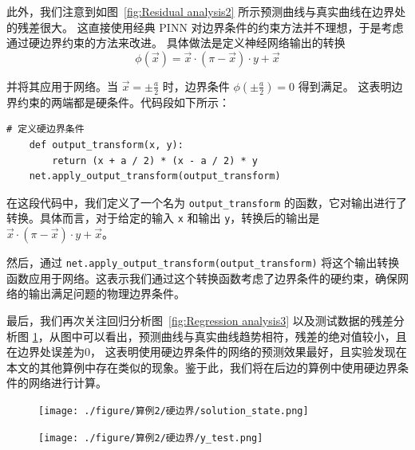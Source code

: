 \documentclass{Sichuan Normal University}
\begin{document}
此外，我们注意到如图~\ref{fig:Residual analysis2} 所示预测曲线与真实曲线在边界处的残差很大。
这直接使用经典 PINN 对边界条件的约束方法并不理想，于是考虑通过硬边界约束的方法来改进。
具体做法是定义神经网络输出的转换
\begin{equation}
    \phi(\vec{x})=\vec{x} \cdot(\pi-\vec{x}) \cdot y+\vec{x}
\end{equation}

并将其应用于网络。当 $\vec{x}=\pm \frac{a}{2}$ 时，边界条件 $\phi(\pm \frac{a}{2})=0$ 得到满足。
这表明边界约束的两端都是硬条件。代码段如下所示：
\begin{lstlisting}[style=python,basicstyle=\footnotesize\fontspec{Courier New},]  
    # 定义硬边界条件
    def output_transform(x, y):
        return (x + a / 2) * (x - a / 2) * y
    net.apply_output_transform(output_transform)
\end{lstlisting}

在这段代码中，我们定义了一个名为 \texttt{output\_transform} 的函数，它对输出进行了转换。具体而言，对于给定的输入 \texttt{x} 和输出 \texttt{y}，转换后的输出是 $\vec{x} \cdot(\pi-\vec{x}) \cdot y+\vec{x}$。

然后，通过 \texttt{net.apply\_output\_transform(output\_transform)} 将这个输出转换函数应用于网络。这表示我们通过这个转换函数考虑了边界条件的硬约束，确保网络的输出满足问题的物理边界条件。

最后，我们再次关注回归分析图~\ref{fig:Regression analysis3} 以及测试数据的残差分析图 \ref{fig:Residual analysis3}，从图中可以看出，预测曲线与真实曲线趋势相符，残差的绝对值较小，且在边界处误差为$0$，
这表明使用硬边界条件的网络的预测效果最好，且实验发现在本文的其他算例中存在类似的现象。鉴于此，我们将在后边的算例中使用硬边界条件的网络进行计算。

\begin{figure}[H]
    \centering
    \begin{minipage}[c]{0.48\textwidth}
    \centering
    \texttt{[image: ./figure/算例2/硬边界/solution\_state.png]}
    \end{minipage}
    \hspace{0.02\textwidth}
    \begin{minipage}[c]{0.48\textwidth}
    \centering
    \texttt{[image: ./figure/算例2/硬边界/y\_test.png]}
    \end{minipage}\\[3mm]
    \begin{minipage}[t]{0.48\textwidth}
    \centering
    \label{fig:Regression analysis3}
    \end{minipage}
    \hspace{0.02\textwidth}
    \begin{minipage}[t]{0.48\textwidth}
    \centering
    \label{fig:Residual analysis3}
    \end{minipage}
    \end{figure}
    
\end{document}
